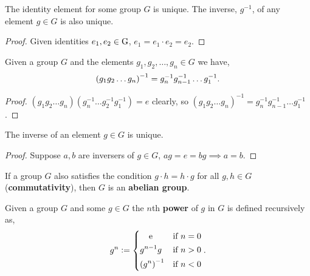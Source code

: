 \documentclass[../Year1/Year1.tex]{subfiles}
\begin{document}
\begin{theorem}
    The identity element for some group $G$ is unique. The inverse, $g^{-1}$, of any element $g\in G$ is also unique.
\end{theorem}

\begin{proof}
    Given identities $e_1,e_2\in\mathrm{G}$, $e_1 = e_1\cdot e_2 = e_2$.
\end{proof}

\begingroup\belowdisplayskip=-10pt
\begin{lemma}
    Given a group $G$ and the elements $g_1,g_2,\ldots,g_n\in G$ we have, \[
        {(g_1g_2\dots g_n)}^{-1} = g_n^{-1}g_{n-1}^{-1}\dots g_1^{-1}
        \textcolor{black}{.}
    \]
\end{lemma}
\endgroup

\begin{proof}
    $(g_1g_2\ldots g_n)(g_n^{-1}\ldots g_2^{-1}g_1^{-1}) = e$ clearly, so ${(g_1g_2\dots g_n)}^{-1} = g_n^{-1}g_{n-1}^{-1}\dots g_1^{-1}$.
\end{proof}

\begin{lemma}
    The inverse of an element $g\in G$ is unique.
\end{lemma}

\begin{proof}
    Suppose $a,b$ are inversers of $g\in G$, $ag=e=bg\implies a=b$.
\end{proof}

\begin{definition}
    If a group $G$ also satisfies the condition $g\cdot h = h\cdot g$ for all $g,h\in G$ (\textbf{commutativity}), then $G$ is an \textbf{abelian group}.
\end{definition}

\begin{definition}
    Given a group $G$ and some $g\in G$ the $n$th \textbf{power} of $g$ in $G$ is defined recursively as, \[
        g^n:= \begin{dcases}
            \omit\hfil e  \hfil & \text{\textcolor{black}{if }} n=0 \\
            g^{n-1}g & \text{\textcolor{black}{if }} n>0 \\
            {(g^{n})}^{-1} & \text{\textcolor{black}{if }} n<0 \\
        \end{dcases}
    \textcolor{black}{.}
    \]
\end{definition}
\vspace{-20pt}
\end{document}
